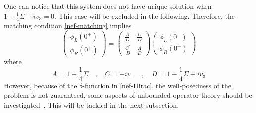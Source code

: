 One can notice that this system does not have unique solution when $1 - \frac{1}{4}\Sigma + iv_3 = 0$. This case will be excluded in the following.
Therefore, the matching condition \cref{nef-matching} implies 
\begin{equation}\label{nef-matching2}
\begin{pmatrix}
\phi_L(0^+) \\
\phi_R(0^+)
\end{pmatrix} = \begin{pmatrix}
\frac{A}{D}  & \frac{C}{D} \\
\frac{C^*}{D} & \frac{A}{D}
\end{pmatrix}\begin{pmatrix}
\phi_L(0^-) \\
\phi_R(0^-)
\end{pmatrix}
\end{equation}
where 
\begin{equation*}
A = 1+ \frac{1}{4}\Sigma \quad, \quad
C = -iv_-  \quad, \quad
D = 1-\frac{1}{4}\Sigma + iv_3
\end{equation*}
%
%
However, because of the $\delta$-function in \cref{nef-Dirac}, 
the well-posedness of the problem is not guaranteed,
some aspects of unbounded operator theory should be investigated~\cite{Reed1981}.
This will be tackled in the next subsection.
%



%
%
%
%


















